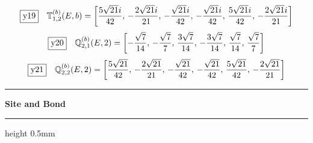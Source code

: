 \documentclass[fleqn,10pt,landscape]{jsarticle}
\begin{document}
\begin{dmath*}
\fbox{y19}\quad \mathbb{T}_{1,2}^{(b)}(E,b)=\left[ \frac{5 \sqrt{21} i}{42},\, - \frac{2 \sqrt{21} i}{21},\, - \frac{\sqrt{21} i}{42},\, - \frac{\sqrt{21} i}{42},\, \frac{5 \sqrt{21} i}{42},\, - \frac{2 \sqrt{21} i}{21} \right]
\end{dmath*}
\begin{dmath*}
\fbox{y20}\quad \mathbb{Q}_{2,1}^{(b)}(E,2)=\left[ - \frac{\sqrt{7}}{14},\, - \frac{\sqrt{7}}{7},\, \frac{3 \sqrt{7}}{14},\, - \frac{3 \sqrt{7}}{14},\, \frac{\sqrt{7}}{14},\, \frac{\sqrt{7}}{7} \right]
\end{dmath*}
\begin{dmath*}
\fbox{y21}\quad \mathbb{Q}_{2,2}^{(b)}(E,2)=\left[ \frac{5 \sqrt{21}}{42},\, - \frac{2 \sqrt{21}}{21},\, - \frac{\sqrt{21}}{42},\, - \frac{\sqrt{21}}{42},\, \frac{5 \sqrt{21}}{42},\, - \frac{2 \sqrt{21}}{21} \right]
\end{dmath*}
\vspace{5mm}
\noindent \rule[0.5mm]{5mm}{0.5mm}\hspace{3mm}\textbf{Site and Bond}\hspace{3mm}\leaders\hrule height 0.5mm\hfill\kern0pt
\vspace{3mm}
\end{document}
